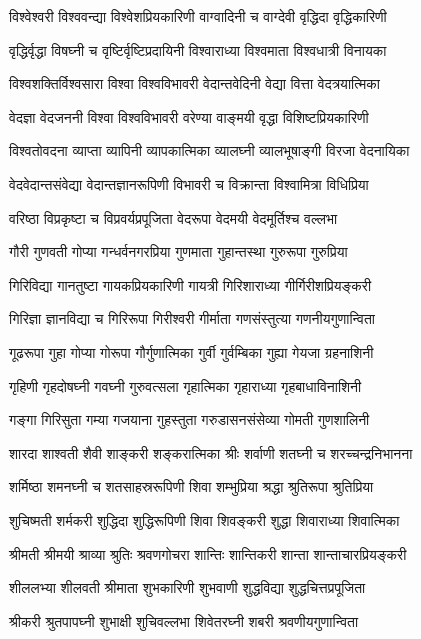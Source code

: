 \twolineshloka
{विश्वेश्वरी विश्ववन्द्या विश्वेशप्रियकारिणी}
{वाग्वादिनी च वाग्देवी वृद्धिदा वृद्धिकारिणी}%

\twolineshloka
{वृद्धिर्वृद्धा विषघ्नी च वृष्टिर्वृष्टिप्रदायिनी}
{विश्वाराध्या विश्वमाता विश्वधात्री विनायका}%

\twolineshloka
{विश्वशक्तिर्विश्वसारा विश्वा विश्वविभावरी}
{वेदान्तवेदिनी वेद्या वित्ता वेदत्रयात्मिका}%

\twolineshloka
{वेदज्ञा वेदजननी विश्वा विश्वविभावरी}
{वरेण्या वाङ्मयी वृद्धा विशिष्टप्रियकारिणी}%

\twolineshloka
{विश्वतोवदना व्याप्ता व्यापिनी व्यापकात्मिका}
{व्यालघ्नी व्यालभूषाङ्गी विरजा वेदनायिका}%

\twolineshloka
{वेदवेदान्तसंवेद्या वेदान्तज्ञानरूपिणी}
{विभावरी च विक्रान्ता विश्वामित्रा विधिप्रिया}%

\twolineshloka
{वरिष्ठा विप्रकृष्टा च विप्रवर्यप्रपूजिता}
{वेदरूपा वेदमयी वेदमूर्तिश्च वल्लभा}%

\twolineshloka
{गौरी गुणवती गोप्या गन्धर्वनगरप्रिया}
{गुणमाता गुहान्तस्था गुरुरूपा गुरुप्रिया}%

\twolineshloka
{गिरिविद्या गानतुष्टा गायकप्रियकारिणी}
{गायत्री गिरिशाराध्या गीर्गिरीशप्रियङ्करी}%

\twolineshloka
{गिरिज्ञा ज्ञानविद्या च गिरिरूपा गिरीश्वरी}
{गीर्माता गणसंस्तुत्या गणनीयगुणान्विता}%

\twolineshloka
{गूढरूपा गुहा गोप्या गोरूपा गौर्गुणात्मिका}
{गुर्वी गुर्वम्बिका गुह्या गेयजा ग्रहनाशिनी}%

\twolineshloka
{गृहिणी गृहदोषघ्नी गवघ्नी गुरुवत्सला}
{गृहात्मिका गृहाराध्या गृहबाधाविनाशिनी}%

\twolineshloka
{गङ्गा गिरिसुता गम्या गजयाना गुहस्तुता}
{गरुडासनसंसेव्या गोमती गुणशालिनी}%

\twolineshloka
{शारदा शाश्वती शैवी शाङ्करी शङ्करात्मिका}
{श्रीः शर्वाणी शतघ्नी च शरच्चन्द्रनिभानना}%

\twolineshloka
{शर्मिष्ठा शमनघ्नी च शतसाहस्ररूपिणी}
{शिवा शम्भुप्रिया श्रद्धा श्रुतिरूपा श्रुतिप्रिया}%

\twolineshloka
{शुचिष्मती शर्मकरी शुद्धिदा शुद्धिरूपिणी}
{शिवा शिवङ्करी शुद्धा शिवाराध्या शिवात्मिका}%

\twolineshloka
{श्रीमती श्रीमयी श्राव्या श्रुतिः श्रवणगोचरा}
{शान्तिः शान्तिकरी शान्ता शान्ताचारप्रियङ्करी}%

\twolineshloka
{शीललभ्या शीलवती श्रीमाता शुभकारिणी}
{शुभवाणी शुद्धविद्या शुद्धचित्तप्रपूजिता}%

\twolineshloka
{श्रीकरी श्रुतपापघ्नी शुभाक्षी शुचिवल्लभा}
{शिवेतरघ्नी शबरी श्रवणीयगुणान्विता}%

